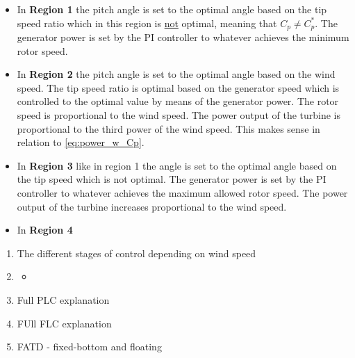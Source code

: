 \begin{itemize}
	\item In \textbf{Region 1} the pitch angle is set to the optimal angle based on the tip speed ratio which in this region is \underline{not} optimal, meaning that $ C_p \neq C_p^* $. The generator power is set by the PI controller to whatever achieves the minimum rotor speed.
	\item In \textbf{Region 2} the pitch angle is set to the optimal angle based on the wind speed. The tip speed ratio is optimal based on the generator speed which is controlled to the optimal value by means of the generator power. The rotor speed is proportional to the wind speed. The power output of the turbine is proportional to the third power of the wind speed. This makes sense in relation to \cref{eq:power_w_Cp}.
	\item In \textbf{Region 3} like in region 1 the angle is set to the optimal angle based on the tip speed which is not optimal. The generator power is set by the PI controller to whatever achieves the maximum allowed rotor speed. The power output of the turbine increases proportional to the wind speed.
	\item In \textbf{Region 4} 
\end{itemize}







\begin{enumerate}
	\item The different stages of control depending on wind speed
	\item \begin{itemize}
		\item 
		\end{itemize}
	\item Full PLC explanation
	\item FUll FLC explanation
	\item FATD - fixed-bottom and floating
\end{enumerate}




